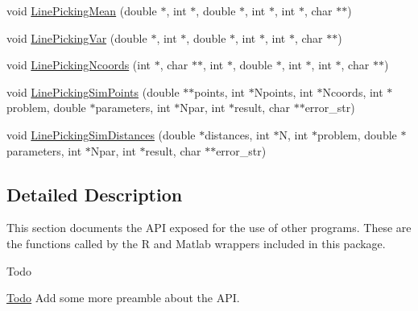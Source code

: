 \begin{DoxyCompactItemize}
\item 
void \hyperlink{group__api_ga39879835a11f7af8bf65699f9d83a5cb}{Line\-Picking\-Mean} (double $\ast$, int $\ast$, double $\ast$, int $\ast$, int $\ast$, char $\ast$$\ast$)
\item 
void \hyperlink{group__api_ga08fecba488534373e8d1710f273bc49c}{Line\-Picking\-Var} (double $\ast$, int $\ast$, double $\ast$, int $\ast$, int $\ast$, char $\ast$$\ast$)
\item 
void \hyperlink{group__api_ga89bd29435ffe1826e97dafb2b0536de1}{Line\-Picking\-Ncoords} (int $\ast$, char $\ast$$\ast$, int $\ast$, double $\ast$, int $\ast$, int $\ast$, char $\ast$$\ast$)
\item 
void \hyperlink{group__api_gad3880c7898c35953c9c55ced33beb222}{Line\-Picking\-Sim\-Points} (double $\ast$$\ast$points, int $\ast$Npoints, int $\ast$Ncoords, int $\ast$problem, double $\ast$parameters, int $\ast$Npar, int $\ast$result, char $\ast$$\ast$error\-\_\-str)
\item 
void \hyperlink{group__api_gade24923f75c83155e6cf15f3d7d7cb09}{Line\-Picking\-Sim\-Distances} (double $\ast$distances, int $\ast$N, int $\ast$problem, double $\ast$parameters, int $\ast$Npar, int $\ast$result, char $\ast$$\ast$error\-\_\-str)
\end{DoxyCompactItemize}


\subsection{Detailed Description}
This section documents the A\-P\-I exposed for the use of other programs. These are the functions called by the R and Matlab wrappers included in this package. \begin{DoxyRefDesc}{Todo}
\item[\hyperlink{todo__todo000012}{Todo}]Add some more preamble about the A\-P\-I.\end{DoxyRefDesc}


